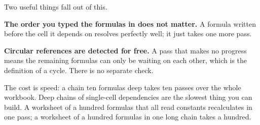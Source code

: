 \begin{ccfigure}
\caption{A three-deep chain settling in three passes}
\label{fig:recalcpasses}
\end{ccfigure}

Two useful things fall out of this.

\begin{ccsteps}
\item \textbf{The order you typed the formulas in does not matter.} A formula
written before the cell it depends on resolves perfectly well; it just takes
one more pass.
\item \textbf{Circular references are detected for free.} A pass that makes no
progress means the remaining formulas can only be waiting on each other, which
is the definition of a cycle. There is no separate check.
\end{ccsteps}

The cost is speed: a chain ten formulas deep takes ten passes over the whole
workbook. Deep chains of single-cell dependencies are the slowest thing you can
build. A worksheet of a hundred formulas that all read constants recalculates in
one pass; a worksheet of a hundred formulas in one long chain takes a hundred.

